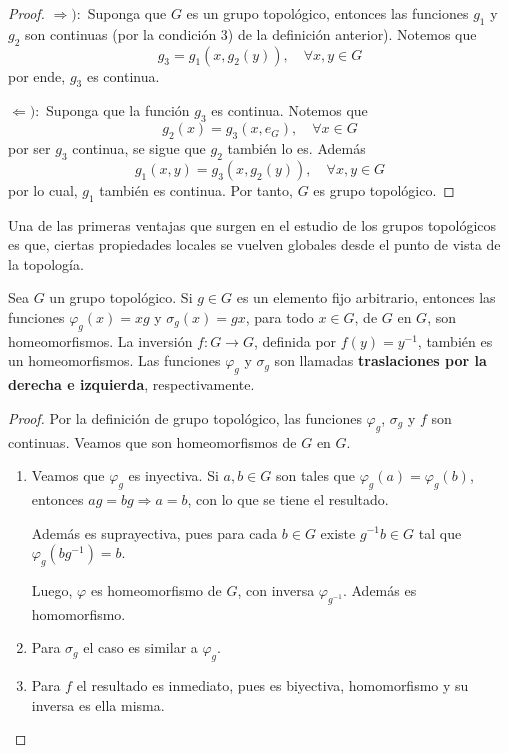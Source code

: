 \documentclass[12pt]{report}
\theoremstyle{largebreak}
\newcommand{\cf}[3]{\ensuremath{#1:#2\rightarrow#3}}
\begin{document}
    \begin{proof}
        $\Rightarrow):$ Suponga que $G$ es un grupo topológico, entonces las funciones $g_1$ y $g_2$ son continuas (por la condición 3) de la definición anterior). Notemos que
        \begin{equation*}
            g_3=g_1(x,g_2(y)),\quad\forall x,y\in G
        \end{equation*}
        por ende, $g_3$ es continua.

        $\Leftarrow):$ Suponga que la función $g_3$ es continua. Notemos que
        \begin{equation*}
            g_2(x)=g_3(x,e_G),\quad\forall x\in G
        \end{equation*}
        por ser $g_3$ continua, se sigue que $g_2$ también lo es. Además
        \begin{equation*}
            g_1(x,y)=g_3(x,g_2(y)),\quad\forall x,y\in G
        \end{equation*}
        por lo cual, $g_1$ también es continua. Por tanto, $G$ es grupo topológico.
    \end{proof}

    Una de las primeras ventajas que surgen en el estudio de los grupos topológicos es que, ciertas propiedades locales se vuelven globales desde el punto de vista de la topología.

    \begin{theor}
        Sea $G$ un grupo topológico. Si $g\in G$ es un elemento fijo arbitrario, entonces las funciones $\varphi_g(x)=xg$ y $\sigma_g(x)=gx$, para todo $x\in G$, de $G$ en $G$, son homeomorfismos. La inversión $\cf{f}{G}{G}$, definida por $f(y)=y^{-1}$, también es un homeomorfismos. Las funciones $\varphi_g$ y $\sigma_g$ son llamadas \textbf{traslaciones por la derecha e izquierda}, respectivamente.
    \end{theor}

    \begin{proof}
        Por la definición de grupo topológico, las funciones $\varphi_g$, $\sigma_g$ y $f$ son continuas. Veamos que son homeomorfismos de $G$ en $G$.
        \begin{enumerate}
            \item Veamos que $\varphi_g$ es inyectiva. Si $a,b\in G$ son tales que $\varphi_g(a)=\varphi_g(b)$, entonces $ag = bg\Rightarrow a = b$, con lo que se tiene el resultado.
            
            Además es suprayectiva, pues para cada $b\in G$ existe $g^{-1}b\in G$ tal que $\varphi_g(bg^{-1})=b$.

            Luego, $\varphi$ es homeomorfismo de $G$, con inversa $\varphi_{g^{-1}}$. Además es homomorfismo.
            \item Para $\sigma_g$ el caso es similar a $\varphi_g$.
            \item Para $f$ el resultado es inmediato, pues es biyectiva, homomorfismo y su inversa es ella misma.
        \end{enumerate}
    \end{proof}
\end{document}
